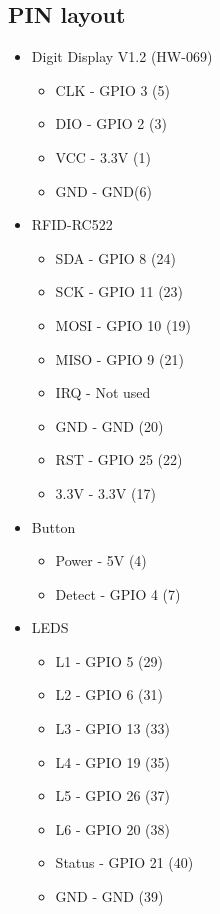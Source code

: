 \documentclass{article}
\begin{document}
\subsection{PIN layout} \label{pins}
\begin{itemize}
    \item Digit Display V1.2 (HW-069)
        \begin{itemize}
            \item CLK - GPIO 3 (5)
            \item DIO - GPIO 2 (3)
            \item VCC - 3.3V (1)
            \item GND - GND(6)
        \end{itemize}
    \item RFID-RC522
        \begin{itemize}
            \item SDA - GPIO 8 (24)
            \item SCK - GPIO 11 (23)
            \item MOSI - GPIO 10 (19)
            \item MISO - GPIO 9 (21)
            \item IRQ - Not used
            \item GND - GND (20)
            \item RST - GPIO 25 (22)
            \item 3.3V - 3.3V (17)
        \end{itemize}
    \item Button
        \begin{itemize}
            \item Power - 5V (4)
            \item Detect - GPIO 4 (7)
        \end{itemize}
    \item LEDS
        \begin{itemize}
            \item L1 - GPIO 5 (29)
            \item L2 - GPIO 6 (31)
            \item L3 - GPIO 13 (33)
            \item L4 - GPIO 19 (35)
            \item L5 - GPIO 26 (37)
            \item L6 - GPIO 20 (38)
            \item Status - GPIO 21 (40)
            \item GND - GND (39)
        \end{itemize}
\end{itemize}
\end{document}

